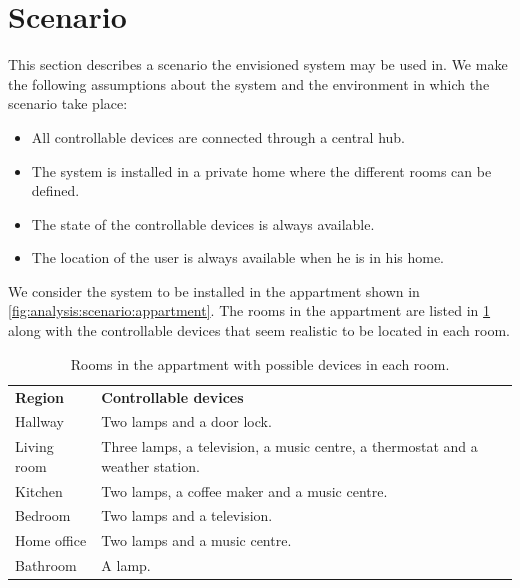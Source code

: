 \section{Scenario}
\label{sec:analysis:scenarios}


This section describes a scenario the envisioned system may be used in. We make the following assumptions about the system and the environment in which the scenario take place:

\begin{itemize}
    \item All controllable devices are connected through a central hub.
    \item The system is installed in a private home where the different rooms can be defined.
    \item The state of the controllable devices is always available.
    \item The location of the user is always available when he is in his home.
\end{itemize}

We consider the system to be installed in the appartment shown in \cref{fig:analysis:scenario:appartment}. The rooms in the appartment are listed in \cref{tbl:analysis:scenario:rooms} along with the controllable devices that seem realistic to be located in each room.

\begin{table}[h!]
\centering
\caption{Rooms in the appartment with possible devices in each room.}
\label{tbl:analysis:scenario:rooms}
\begin{tabular}{ll}
\textbf{Region} & \textbf{Controllable devices}                                                 \\
Hallway         & Two lamps and a door lock.                                                    \\
Living room     & Three lamps, a television, a music centre, a thermostat and a weather station.\\
Kitchen         & Two lamps, a coffee maker and a music centre.                                 \\
Bedroom         & Two lamps and a television.                                                   \\
Home office     & Two lamps and a music centre.                                                 \\
Bathroom        & A lamp.                                                                      
\end{tabular}
\end{table}

